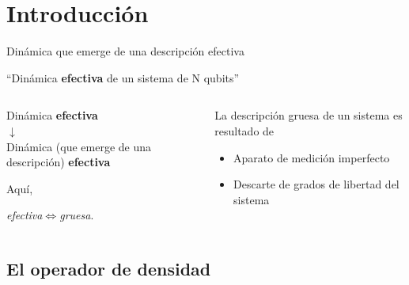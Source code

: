 \section{Introducción}


\begin{frame}{Dinámica que emerge de una descripción efectiva}
    \begin{center}
        ``Dinámica \textbf{efectiva} de un sistema de N qubits''
    \end{center}
    \pause
    \begin{columns}
        \begin{column}{0.5\textwidth}
            \begin{center}
                Dinámica \textbf{efectiva}\\
                \pause
                $\downarrow$\\
                Dinámica {\tiny(que emerge de una descripción)} \textbf{efectiva}
            \end{center}
            \pause
            Aquí, 
            \begin{center}
                \textit{efectiva}$\iff$\textit{gruesa}.
            \end{center}
        \end{column}
        \pause
        \begin{column}{0.5\textwidth}
            La descripción gruesa de un sistema es resultado de
            \begin{itemize}
                \item Aparato de medición imperfecto
                \item Descarte de grados de libertad del sistema
            \end{itemize}
        \end{column}
    \end{columns}
\end{frame}


\subsection{El operador de densidad}

